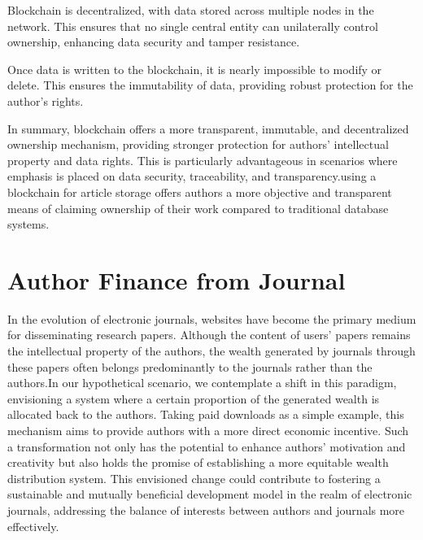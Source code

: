 \documentclass[lettersize,journal]{IEEEtran}
\begin{document}
Blockchain is decentralized, with data stored across multiple nodes in the network. This ensures that no single central entity can unilaterally control ownership, enhancing data security and tamper resistance.

Once data is written to the blockchain, it is nearly impossible to modify or delete. This ensures the immutability of data, providing robust protection for the author's rights.

In summary, blockchain offers a more transparent, immutable, and decentralized ownership mechanism, providing stronger protection for authors' intellectual property and data rights. This is particularly advantageous in scenarios where emphasis is placed on data security, traceability, and transparency.using a blockchain for article storage offers authors a more objective and transparent means of claiming ownership of their work compared to traditional database systems.

\section{Author Finance from Journal}

In the evolution of electronic journals, websites have become the primary medium for disseminating research papers. Although the content of users' papers remains the intellectual property of the authors, the wealth generated by journals through these papers often belongs predominantly to the journals rather than the authors.In our hypothetical scenario, we contemplate a shift in this paradigm, envisioning a system where a certain proportion of the generated wealth is allocated back to the authors. Taking paid downloads as a simple example, this mechanism aims to provide authors with a more direct economic incentive. Such a transformation not only has the potential to enhance authors' motivation and creativity but also holds the promise of establishing a more equitable wealth distribution system. This envisioned change could contribute to fostering a sustainable and mutually beneficial development model in the realm of electronic journals, addressing the balance of interests between authors and journals more effectively.
\end{document}
